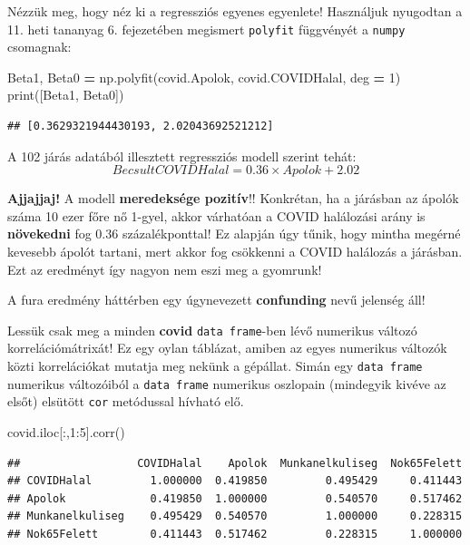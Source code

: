 \documentclass[
]{book}
\newenvironment{Shaded}{\begin{snugshade}}{\end{snugshade}}
\newcommand{\BuiltInTok}[1]{#1}
\newcommand{\DecValTok}[1]{\textcolor[rgb]{0.00,0.00,0.81}{#1}}
\newcommand{\NormalTok}[1]{#1}
\newcommand{\OperatorTok}[1]{\textcolor[rgb]{0.81,0.36,0.00}{\textbf{#1}}}
\begin{document}
Nézzük meg, hogy néz ki a regressziós egyenes egyenlete! Használjuk nyugodtan a 11. heti tananyag 6. fejezetében megismert \texttt{polyfit} függvényét a \texttt{numpy} csomagnak:

\begin{Shaded}
\begin{Highlighting}[]
\NormalTok{Beta1, Beta0 }\OperatorTok{=}\NormalTok{ np.polyfit(covid.Apolok, covid.COVIDHalal, deg }\OperatorTok{=} \DecValTok{1}\NormalTok{)}
\BuiltInTok{print}\NormalTok{([Beta1, Beta0])}
\end{Highlighting}
\end{Shaded}

\begin{verbatim}
## [0.3629321944430193, 2.02043692521212]
\end{verbatim}

A 102 járás adatából illesztett regressziós modell szerint tehát: \[Becsult COVIDHalal= 0.36 \times Apolok + 2.02\]

\textbf{Ajjajjaj!} A modell \textbf{meredeksége pozitív}!! Konkrétan, ha a járásban az ápolók száma 10 ezer főre nő 1-gyel, akkor várhatóan a COVID halálozási arány is \textbf{növekedni} fog 0.36 százalékponttal! Ez alapján úgy tűnik, hogy mintha megérné kevesebb ápolót tartani, mert akkor fog csökkenni a COVID halálozás a járásban. Ezt az eredményt így nagyon nem eszi meg a gyomrunk!

A fura eredmény háttérben egy úgynevezett \textbf{confunding} nevű jelenség áll!

Lessük csak meg a minden \textbf{covid} \texttt{data\ frame}-ben lévő numerikus változó korrelációmátrixát! Ez egy oylan táblázat, amiben az egyes numerikus változók közti korrelációkat mutatja meg nekünk a gépállat. Simán egy \texttt{data\ frame} numerikus változóiból a \texttt{data\ frame} numerikus oszlopain (mindegyik kivéve az elsőt) elsütött \texttt{cor} metódussal hívható elő.

\begin{Shaded}
\begin{Highlighting}[]
\NormalTok{covid.iloc[:,}\DecValTok{1}\NormalTok{:}\DecValTok{5}\NormalTok{].corr()}
\end{Highlighting}
\end{Shaded}

\begin{verbatim}
##                  COVIDHalal    Apolok  Munkanelkuliseg  Nok65Felett
## COVIDHalal         1.000000  0.419850         0.495429     0.411443
## Apolok             0.419850  1.000000         0.540570     0.517462
## Munkanelkuliseg    0.495429  0.540570         1.000000     0.228315
## Nok65Felett        0.411443  0.517462         0.228315     1.000000
\end{verbatim}
\end{document}

